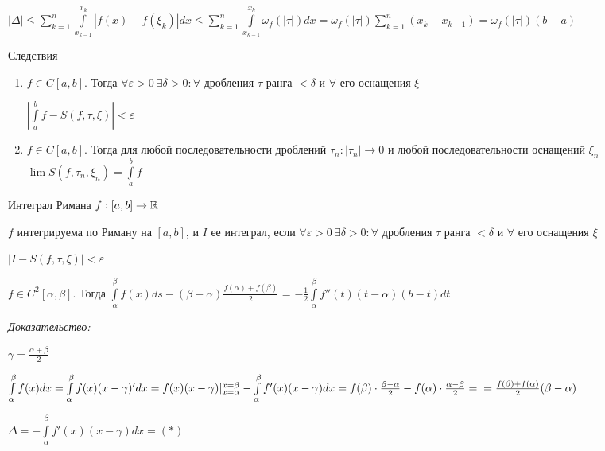 \documentclass[12pt]{article}
\begin{document}
$|\Delta| \leq \sum\limits_{k = 1}^n \int\limits_{x_{k - 1}}^{x_k} |f(x) - f(\xi_k)|dx \leq \sum\limits_{k = 1}^n \int\limits_{x_{k - 1}}^{x_k} \omega_f(|\tau|)dx = \omega_f(|\tau|) \sum\limits_{k = 1}^n (x_k - x_{k - 1}) = \omega_f(|\tau|)(b - a)$

\begin{theo}{Следствия}
    \begin{enumerate}
        \item $f \in C[a, b]$. Тогда $\forall \varepsilon > 0\ \exists \delta > 0 : \forall$ дробления $\tau$ ранга $< \delta$ и $\forall$ его оснащения $\xi$
        
        $|\int\limits_a^b f - S(f, \tau, \xi)| < \varepsilon$

        \item $f \in C[a, b]$. Тогда для любой последовательности дроблений $\tau_n : |\tau_n| \to 0$ и любой последовательности оснащений $\xi_n$ $\lim S(f, \tau_n, \xi_n) = \int\limits_a^b f$
    \end{enumerate}
\end{theo}

\begin{defin}{Интеграл Римана}
    $f : [a, b] \to \mathbb R$

    $f$ интегрируема по Риману на $[a, b]$, и $I$ ее интеграл, если $\forall \varepsilon > 0\ \exists \delta > 0 : \forall$ дробления $\tau$ ранга $< \delta$ и $\forall$ его оснащения $\xi$

    $|I - S(f, \tau, \xi)| < \varepsilon$
\end{defin}

\begin{lem}{}
    $f \in C^2[\alpha, \beta]$. Тогда $\int\limits_\alpha^\beta f(x)ds - (\beta - \alpha)\frac{f(\alpha) + f(\beta)}{2}$ = $- \frac{1}{2} \int\limits_{\alpha}^{\beta} f''(t)(t - \alpha)(b - t)dt$
\end{lem}

\textit{Доказательство:}

$\gamma = \frac{\alpha + \beta}{2}$

$\int\limits_\alpha^\beta f(x)dx = \int\limits_\alpha^\beta f(x)(x - \gamma)'dx = f(x)(x - \gamma)|_{x = \alpha}^{x = \beta} - \int\limits_\alpha^\beta f'(x)(x - \gamma)dx = f(\beta) \cdot \frac{\beta - \alpha}{2} - f(\alpha) \cdot \frac{\alpha - \beta}{2} = \\ = \frac{f(\beta) + f(\alpha)}{2} (\beta - \alpha)$

$\Delta = - \int\limits_\alpha^\beta f'(x)(x - \gamma)dx = (*)$
\end{document}
